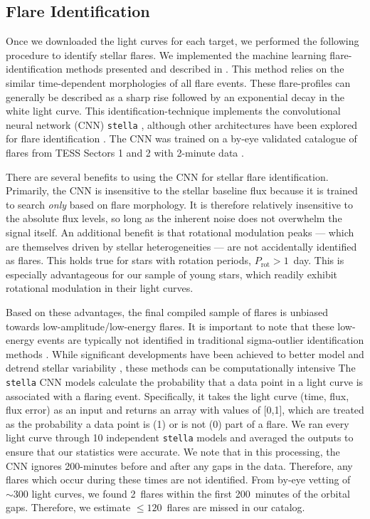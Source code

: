 \documentclass[twocolumn]{aastex631}
\begin{document}
\subsection{Flare Identification}\label{subsec2:Flareidentification}

Once we downloaded the light curves for each target, we performed the following
procedure to identify stellar flares. We implemented the machine learning
flare-identification methods presented and described in \cite{feinstein20}.
This method relies on the similar time-dependent morphologies of all flare events.
These flare-profiles can generally be described as a sharp rise followed by an
exponential decay in the white light curve. This identification-technique implements
the convolutional neural network (CNN) \texttt{stella} \citep{feinstein20},
although other architectures have been explored for flare identification
\citep[e.g.][]{vida18}. The CNN  was trained on a by-eye validated catalogue of flares
from TESS Sectors 1 and 2 with 2-minute data \citep{guenther19_flares}.

There are several benefits to using the CNN for stellar flare identification. Primarily,
the CNN is insensitive to the stellar baseline flux because it is trained to search
\textit{only} based on flare morphology. It is therefore relatively insensitive to
the absolute flux levels, so long as the inherent noise does not overwhelm the signal
itself. An additional benefit is that rotational modulation peaks --- which are
themselves driven by stellar heterogeneities --- are not accidentally identified as
flares. This holds true for stars with rotation periods, $P_\textrm{rot} > 1$~day.
This is especially advantageous for our sample of young stars, which readily exhibit
rotational modulation in their light curves.

Based on these advantages, the final compiled sample of flares is unbiased towards
low-amplitude/low-energy flares. It is important to note that these low-energy events
are typically not identified in traditional sigma-outlier identification
methods \citep[e.g.][]{chang15, vasilyev22}. While
significant developments have been achieved to better model and detrend stellar
variability \citep[e.g.][]{bicz22}, these methods can be computationally intensive
The \texttt{stella} CNN models calculate the probability that a data point in a light
curve is associated with a flaring event. Specifically, it takes the light curve (time,
flux, flux error) as an input and returns an array with values of [0,1], which are
treated as the probability a data point is (1) or is not (0) part of a flare. We ran
every light curve through 10 independent \texttt{stella} models and averaged the
outputs to ensure that our statistics were accurate. We note that in this processing,
the CNN ignores 200-minutes before and after any gaps in the data. Therefore, any
flares which occur during these times are not identified. From by-eye
vetting of $\sim 300$ light curves, we found 2~flares within the first 200~minutes of
the orbital gaps. Therefore, we estimate $\leq 120$~flares are missed in our catalog.
\end{document}
